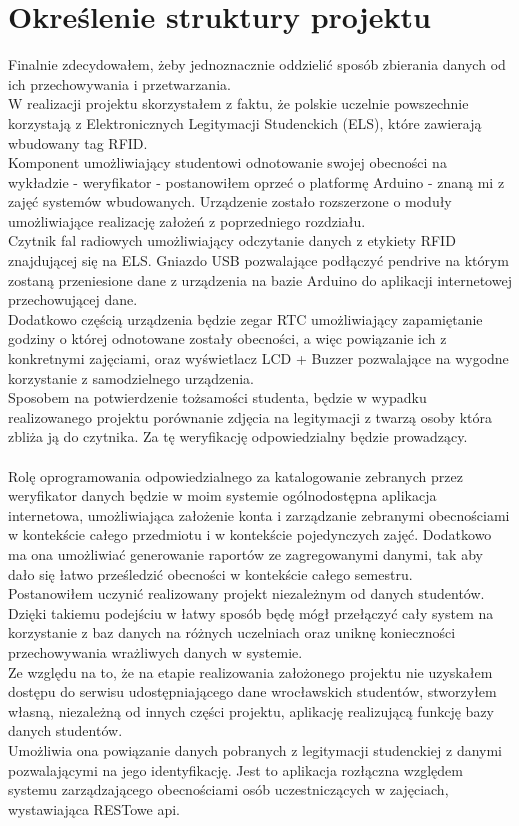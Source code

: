 \documentclass[declaration,shortabstract, mgr]{iithesis}
\begin{document}
\chapter{Określenie struktury projektu}
\indent Finalnie zdecydowałem, żeby jednoznacznie oddzielić sposób zbierania danych od ich przechowywania i przetwarzania.\\
\indent W realizacji projektu skorzystałem z faktu, że polskie uczelnie powszechnie korzystają z Elektronicznych Legitymacji Studenckich (ELS), które zawierają wbudowany tag RFID. \\
\indent Komponent umożliwiający studentowi odnotowanie swojej obecności na wykładzie - weryfikator - postanowiłem oprzeć o platformę Arduino - znaną mi z zajęć systemów wbudowanych. Urządzenie zostało rozszerzone o moduły umożliwiające realizację założeń z poprzedniego rozdziału. \\
\indent Czytnik fal radiowych umożliwiający odczytanie danych z etykiety RFID znajdującej się na ELS. Gniazdo USB pozwalające podłączyć pendrive na którym zostaną przeniesione dane z urządzenia na bazie Arduino do aplikacji internetowej przechowującej dane. \\ 
\indent Dodatkowo częścią urządzenia będzie zegar RTC umożliwiający zapamiętanie godziny o której odnotowane zostały obecności, a więc powiązanie ich z konkretnymi zajęciami, oraz wyświetlacz LCD + Buzzer pozwalające na wygodne korzystanie z samodzielnego urządzenia. \\
\indent Sposobem na potwierdzenie tożsamości studenta, będzie w wypadku realizowanego projektu porównanie zdjęcia na legitymacji z twarzą osoby która zbliża ją do czytnika. Za tę weryfikację odpowiedzialny będzie prowadzący.\\\\

\indent Rolę oprogramowania odpowiedzialnego za katalogowanie zebranych przez weryfikator danych będzie w moim systemie ogólnodostępna aplikacja internetowa, umożliwiająca założenie konta i zarządzanie zebranymi obecnościami w kontekście całego przedmiotu i w kontekście pojedynczych zajęć. Dodatkowo ma ona umożliwiać generowanie raportów ze zagregowanymi danymi, tak aby dało się łatwo prześledzić obecności w kontekście całego semestru. \\
\indent Postanowiłem uczynić realizowany projekt niezależnym od danych studentów. Dzięki takiemu podejściu w łatwy sposób będę mógł przełączyć cały system na korzystanie z baz danych na różnych uczelniach oraz uniknę konieczności przechowywania wrażliwych danych w systemie. \\
\indent Ze względu na to, że na etapie realizowania założonego projektu nie uzyskałem dostępu do serwisu udostępniającego dane wrocławskich studentów, stworzyłem własną, niezależną od innych części projektu, aplikację realizującą funkcję bazy danych studentów. \\
\indent Umożliwia ona powiązanie danych pobranych z legitymacji studenckiej z danymi pozwalającymi na jego identyfikację. Jest to aplikacja rozłączna względem systemu zarządzającego obecnościami osób uczestniczących w zajęciach, wystawiająca RESTowe api.
\end{document}
